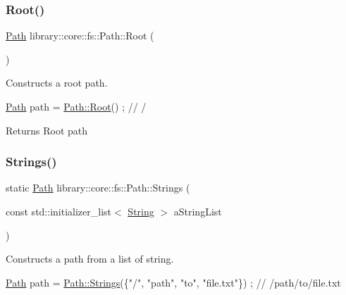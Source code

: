 \subsubsection{\texorpdfstring{Root()}{Root()}}
{\footnotesize\ttfamily \hyperlink{classlibrary_1_1core_1_1fs_1_1_path}{Path} library\+::core\+::fs\+::\+Path\+::\+Root (\begin{DoxyParamCaption}{ }\end{DoxyParamCaption})\hspace{0.3cm}{\ttfamily [static]}}



Constructs a root path. 


\begin{DoxyCode}
\hyperlink{classlibrary_1_1core_1_1fs_1_1_path_aabc4240fc08479d1bff6b9753f2b5cc2}{Path} path = \hyperlink{classlibrary_1_1core_1_1fs_1_1_path_a59d9a7b2fcca844a82d22742b5a110ac}{Path::Root}() ; \textcolor{comment}{// /}
\end{DoxyCode}


\begin{DoxyReturn}{Returns}
Root path 
\end{DoxyReturn}
\mbox{\label{classlibrary_1_1core_1_1fs_1_1_path_a94a2bd454a137249bab970e29a5a95f2}} 
\subsubsection{\texorpdfstring{Strings()}{Strings()}}
{\footnotesize\ttfamily static \hyperlink{classlibrary_1_1core_1_1fs_1_1_path}{Path} library\+::core\+::fs\+::\+Path\+::\+Strings (\begin{DoxyParamCaption}\item[{const std\+::initializer\+\_\+list$<$ \hyperlink{classlibrary_1_1core_1_1types_1_1_string}{String} $>$}]{a\+String\+List }\end{DoxyParamCaption})\hspace{0.3cm}{\ttfamily [static]}}



Constructs a path from a list of string. 


\begin{DoxyCode}
\hyperlink{classlibrary_1_1core_1_1fs_1_1_path_aabc4240fc08479d1bff6b9753f2b5cc2}{Path} path = \hyperlink{classlibrary_1_1core_1_1fs_1_1_path_a94a2bd454a137249bab970e29a5a95f2}{Path::Strings}(\{\textcolor{stringliteral}{"/"}, \textcolor{stringliteral}{"path"}, \textcolor{stringliteral}{"to"}, \textcolor{stringliteral}{"file.txt"}\}) ; \textcolor{comment}{// /path/to/file.txt}
\end{DoxyCode}



